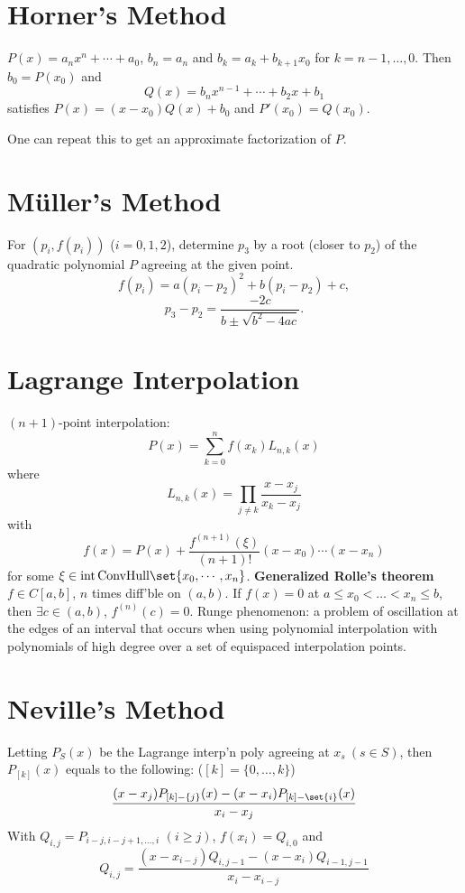 \documentclass[9pt]{memoir}
\begin{document}
\begin{multicols*}{3}
    \section{Horner's Method}
    \s $P(x)=a_n x^n+\cdots + a_0$, $b_n = a_n$ and $b_k = a_k + b_{k+1}x_0$ for $k=n-1,\dots,0$. Then $b_0=P(x_0)$ and
    $$ Q(x)=b_nx^{n-1}+\cdots + b_2x + b_1 $$
    satisfies $P(x) = (x-x_0)Q(x) + b_0$ and $P'(x_0)=Q(x_0)$.

    \s One can repeat this to get an approximate factorization of $P$.

    \section{M\"uller's Method}
    For $(p_i,f(p_i))$ ($i=0,1,2$), determine $p_3$ by a root (closer to $p_2$) of the quadratic polynomial $P$ agreeing at the given point.
    $$ f(p_i) = a(p_i - p_2)^2 + b(p_i - p_2) + c, $$
    $$ p_3 - p_2 = \frac{-2c}{b \pm \sqrt{b^2-4ac}}. $$

    \setcounter{chapter}{3}
    \setcounter{section}{0}
    \section{Lagrange Interpolation}
    \s $(n+1)$-point interpolation:
    $$P(x) = \sum_{k=0}^n f(x_k) L_{n,k}(x)$$
    where
    $$ L_{n,k}(x) = \prod_{j\ne k}\frac{x-x_j}{x_k-x_j}$$
    with
    $$ f(x) = P(x) + \frac{f^{(n+1)}(\xi)}{(n+1)!}(x-x_0)\cdots (x-x_n) $$
    for some $\xi \in \text{int\,ConvHull}\set{x_0,\cdots ,x_n}$.
    \s \textbf{Generalized Rolle's theorem} $f\in C[a,b]$, $n$ times diff'ble on $(a,b)$. If $f(x)=0$ at $a\le x_0<\dots<x_n\le b$, then $\exists c \in (a,b)$, $f^{(n)}(c)=0$. \nl
    \s Runge phenomenon: a problem of oscillation at the edges of an interval that occurs when using polynomial interpolation with polynomials of high degree over a set of equispaced interpolation points.

    \section{Neville's Method}
    \s Letting $P_{S}(x)$ be the Lagrange interp'n poly agreeing at $x_s\ (s\in S)$, then $ P_{[k]}(x) $ equals to the following: ($[k] = \{0,\dots,k\}$)
    $$\frac{(x-x_j)P_{[k]-\{j\}}(x) - (x-x_i) P_{[k]-\set{i}}(x)  }{ x_i-x_j } $$
    \s With $Q_{i,j} = P_{i-j,i-j+1,\dots,i}$ $(i\ge j)$, $f(x_i) = Q_{i,0}$ and
    $$ Q_{i,j} = \frac{(x-x_{i-j}) Q_{i,j-1} - (x-x_i)Q_{i-1,j-1} }{x_i-x_{i-j}} $$


\end{multicols*}
\end{document}
